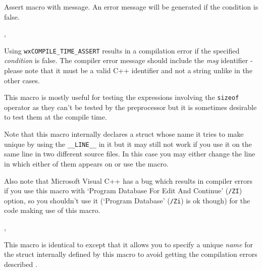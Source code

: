 \label{wxassertmsg}


Assert macro with message. An error message will be generated if the condition is false.


,\\


\label{wxcompiletimeassert}


Using {\tt wxCOMPILE\_TIME\_ASSERT} results in a compilation error if the
specified {\it condition} is false. The compiler error message should include
the {\it msg} identifier - please note that it must be a valid C++ identifier
and not a string unlike in the other cases.

This macro is mostly useful for testing the expressions involving the
{\tt sizeof} operator as they can't be tested by the preprocessor but it is
sometimes desirable to test them at the compile time.

Note that this macro internally declares a struct whose name it tries to make
unique by using the {\tt \_\_LINE\_\_} in it but it may still not work if you
use it on the same line in two different source files. In this case you may
either change the line in which either of them appears on or use the
 macro.

Also note that Microsoft Visual C++ has a bug which results in compiler errors
if you use this macro with `Program Database For Edit And Continue'
(\texttt{/ZI}) option, so you shouldn't use it (`Program Database'
(\texttt{/Zi}) is ok though) for the code making use of this macro.


,\\


\label{wxcompiletimeassert2}


This macro is identical to 
except that it allows you to specify a unique {\it name} for the struct
internally defined by this macro to avoid getting the compilation errors
described .


